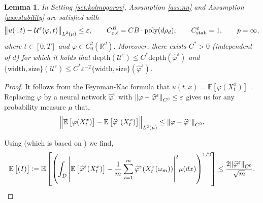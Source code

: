 \documentclass{article}
\numberwithin{equation}{section}
\newcommand{\poly}{\mathrm{poly}}
\newcommand{\size}{\mathrm{size}}
\newcommand{\width}{\mathrm{width}}
\newcommand{\depth}{\mathrm{depth}}
\newcommand{\R}{\mathbb{R}}
\newcommand{\cU}{\mathcal{U}}
\renewcommand{\epsilon}{\varepsilon}
\newcommand{\1}{\mathbbm{1}}
\newcommand{\varphihat}{{\widehat{\varphi}}}
\newcommand{\E}[1]{{\mathbb{E}\left[ #1 \right]}} %
\newtheorem{lemma}[theorem]{Lemma}
\begin{document}
\begin{lemma}\label{lem:kolmogorov}
In Setting \ref{set:kolmogorov}, Assumption \ref{ass:nn} and Assumption \ref{ass:stability} are satisfied with
\begin{equation}
    \norm{u(\cdot, t)-\cU^\epsilon(\varphi, t)}_{L^2(\mu)} \leq \epsilon, \qquad C^B_{\epsilon, \ell} = CB\cdot \poly(d\rho_d), \qquad C^\epsilon_{\mathrm{stab}} = 1, \qquad p=\infty,
\end{equation}
where $t\in[0,T]$ and $\varphi\in C^2_0(\R^d)$. 
Moreover, there exists $C^*>0$ (independent of $d$) for which it holds that $\depth(\cU^\epsilon) \leq C^* \depth(\varphihat^\epsilon)$ and $\{\width,\size\}(\cU^\epsilon) \leq C^* \epsilon^{-2}  \{\width,\size\}(\varphihat^\epsilon) $. 
\end{lemma}
\begin{proof}
It follows from the Feynman-Kac formula that $u(t,x) = \E{\varphi(X^x_t)}$ \cite{oksendal2003stochastic}. Replacing $\varphi$ by a neural network $\varphihat^\epsilon$ with $\norm{\varphi-\varphihat^\epsilon}_{C^0} \leq  \epsilon$ gives us for any probability measure $\mu$ that,
\begin{equation}\label{eq:kolmogorov1}
    \norm{\E{\varphi(X^x_t)}-\E{\varphihat^\epsilon(X^x_t)}}_{L^2(\mu)}\leq \norm{\varphi-\varphihat^\epsilon}_{C^0}. 
\end{equation}

Using \cite[Lemma A.2]{deryck2021pinn} (which is based on \cite{grohs2018proof}) we find, 
\begin{equation}
    \E{(I)} := \E{\left(\int_{D}\abs{\E{\varphihat^\epsilon(X^x_t)}-\frac{1}{m}\sum_{i=1}^m \varphihat^\epsilon(X^x_t(\omega_m))}^2\mu(dx)\right)^{1/2}} \leq \frac{2\norm{\varphihat^\epsilon}_{C^0}}{\sqrt{m}}.
\end{equation}


\end{proof}
\end{document}
